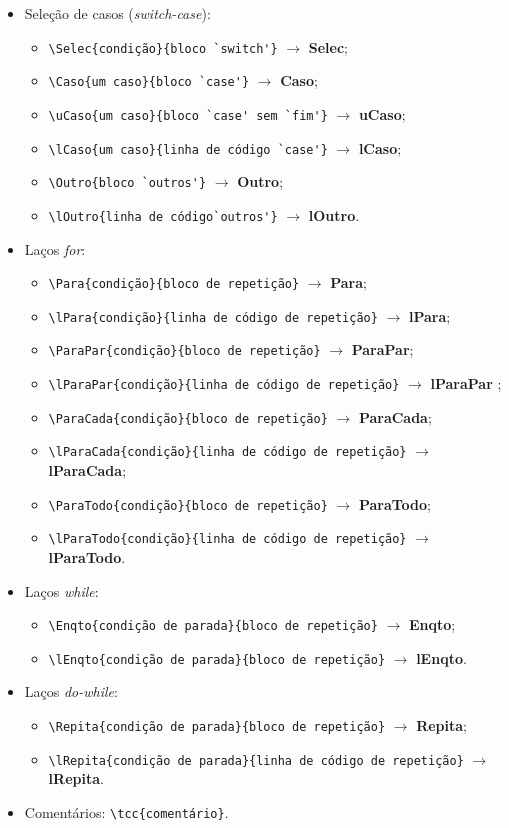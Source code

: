 \begin{itemize}
\begin{itemize}
 	\end{itemize}
\item Seleção de casos (\textit{switch-case}):
	\begin{itemize}
		\item \verb|\Selec{condição}{bloco `switch'}| $\rightarrow$ \textbf{Selec};
  		\item \verb|\Caso{um caso}{bloco `case'}| $\rightarrow$ \textbf{Caso};
  		\item \verb|\uCaso{um caso}{bloco `case' sem `fim'}| $\rightarrow$ \textbf{uCaso};
  		\item \verb|\lCaso{um caso}{linha de código `case'}| $\rightarrow$ \textbf{lCaso};
  		\item \verb|\Outro{bloco `outros'}| $\rightarrow$ \textbf{Outro};
  		\item \verb|\lOutro{linha de código`outros'}| $\rightarrow$ \textbf{lOutro}.
  	\end{itemize}
\item Laços \textit{for}:
	\begin{itemize}
		\item \verb|\Para{condição}{bloco de repetição}| $\rightarrow$ \textbf{Para};
  		\item \verb|\lPara{condição}{linha de código de repetição}| $\rightarrow$ \textbf{lPara};
		\item \verb|\ParaPar{condição}{bloco de repetição}| $\rightarrow$ \textbf{ParaPar};
  		\item \verb|\lParaPar{condição}{linha de código de repetição}| $\rightarrow$ \textbf{lParaPar} ;
  		\item \verb|\ParaCada{condição}{bloco de repetição}| $\rightarrow$ \textbf{ParaCada};
  		\item \verb|\lParaCada{condição}{linha de código de repetição}| $\rightarrow$ \textbf{lParaCada};
		\item \verb|\ParaTodo{condição}{bloco de repetição}| $\rightarrow$ \textbf{ParaTodo};
  		\item \verb|\lParaTodo{condição}{linha de código de repetição}| $\rightarrow$ \textbf{lParaTodo}.
	\end{itemize}
\item Laços \textit{while}:
	\begin{itemize}
		\item \verb|\Enqto{condição de parada}{bloco de repetição}| $\rightarrow$ \textbf{Enqto};
  		\item \verb|\lEnqto{condição de parada}{bloco de repetição}| $\rightarrow$ \textbf{lEnqto}.
	\end{itemize}
\item Laços \textit{do-while}:
	\begin{itemize}
		\item \verb|\Repita{condição de parada}{bloco de repetição}| $\rightarrow$ \textbf{Repita};
  		\item \verb|\lRepita{condição de parada}{linha de código de repetição}| $\rightarrow$ \textbf{lRepita}.
  	\end{itemize}
\item Comentários: \verb|\tcc{comentário}|.
\end{itemize}

